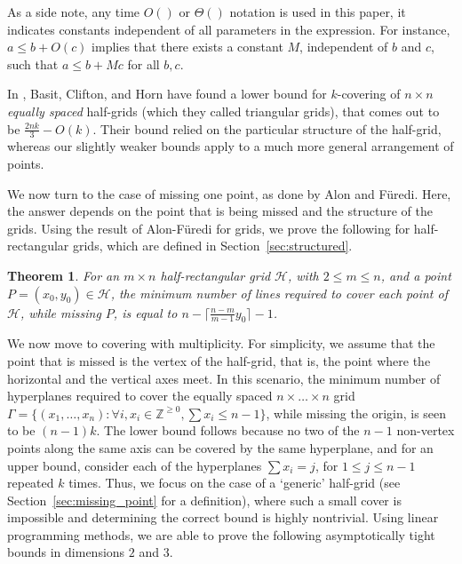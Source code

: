 \documentclass[usenames,dvipsnames, 11pt]{article}
\newtheorem{thm}{Theorem}
\numberwithin{thm}{section}
\theoremstyle{definition}
\theoremstyle{definition}
\theoremstyle{definition}
\newcommand{\1}{\mathbf{1}}
\def\cH{{\mathcal H}}
\begin{document}
As a side note, any time $O()$ or $\Theta()$ notation is used in this paper, it indicates constants independent of all parameters in the expression. For instance, $a \leq b+O(c)$ implies that there exists a constant $M$, independent of $b$ and $c$, such that $a \leq b+Mc$ for all $b,c$.

In \cite{basit2023covering}, Basit, Clifton, and Horn have found a lower bound for $k$-covering of $n \times n$ \textit{equally spaced} half-grids (which they called triangular grids), that comes out to be $\frac{2nk}{3}-O(k)$.
Their bound relied on the particular structure of the half-grid, whereas our slightly weaker bounds apply to a much more general arrangement of points. 


We now turn to the case of missing one point, as done by Alon and F\"uredi. 
Here, the answer depends on the point that is being missed and the structure of the grids. 
Using the result of Alon-F\"uredi for grids, we prove the following for half-rectangular grids, which are defined in Section~\ref{sec:structured}. 


\begin{thm}
\label{thm:structured}
    For an $m \times n$ half-rectangular grid $\cH$, with $2 \leq m \leq n$, and a point $P=(x_0,y_0) \in \cH$, the minimum number of lines required to cover each point of $\cH$, while missing $P$, is equal to $n-\lceil \frac{n-m}{m-1} y_0 \rceil -1$.
\end{thm}

We now move to covering with multiplicity. 
For simplicity, we assume that the point that is missed is the vertex of the half-grid, that is, the point where the horizontal and the vertical axes meet. 
In this scenario, the minimum number of hyperplanes required to cover the equally spaced $n \times \dots \times n$ grid $\Gamma = \{(x_1, \dots, x_n) : \forall i, x_i \in \mathbb{Z}^{\geq 0}, \sum x_i \leq n-1\}$, while missing the origin, 
is seen to be $(n-1)k$. The lower bound follows because no two of the $n-1$ non-vertex points along the same axis can be covered by the same hyperplane, and for an upper bound, consider each of the hyperplanes $\sum x_i = j$, for $1 \leq j \leq n-1$ repeated $k$ times.
Thus, we focus on the case of a `generic' half-grid (see Section~\ref{sec:missing_point} for a definition), where such a small cover is impossible and determining the correct bound is highly nontrivial. 
Using linear programming methods, we are able to prove the following asymptotically tight bounds in dimensions $2$ and $3$. 
\end{document}
